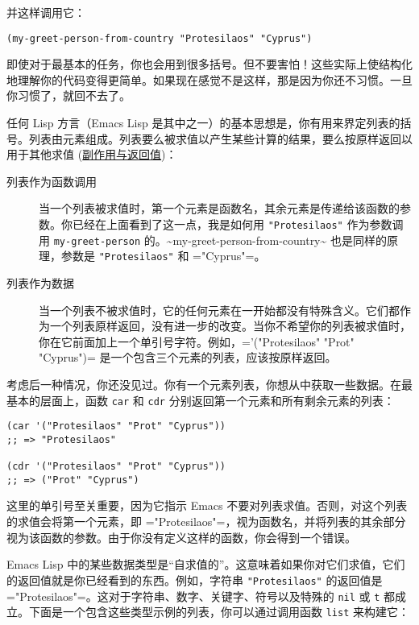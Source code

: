 \documentclass[11pt]{ctexart}
\begin{document}
并这样调用它：

\begin{verbatim}
(my-greet-person-from-country "Protesilaos" "Cyprus")
\end{verbatim}

即使对于最基本的任务，你也会用到很多括号。但不要害怕！这些实际上使结构化地理解你的代码变得更简单。如果现在感觉不是这样，那是因为你还不习惯。一旦你习惯了，就回不去了。

任何 Lisp 方言（Emacs Lisp 是其中之一）的基本思想是，你有用来界定列表的括号。列表由元素组成。列表要么被求值以产生某些计算的结果，要么按原样返回以用于其他求值 (\hyperref[sec:org7601617]{副作用与返回值})：

\begin{description}
\item[{列表作为函数调用}] 当一个列表被求值时，第一个元素是函数名，其余元素是传递给该函数的参数。你已经在上面看到了这一点，我是如何用 \texttt{"Protesilaos"} 作为参数调用 \texttt{my-greet-person} 的。\textasciitilde{}my-greet-person-from-country\textasciitilde{} 也是同样的原理，参数是 \texttt{"Protesilaos"} 和 ="Cyprus"=。

\item[{列表作为数据}] 当一个列表不被求值时，它的任何元素在一开始都没有特殊含义。它们都作为一个列表原样返回，没有进一步的改变。当你不希望你的列表被求值时，你在它前面加上一个单引号字符。例如，='("Protesilaos" "Prot" "Cyprus")= 是一个包含三个元素的列表，应该按原样返回。
\end{description}

考虑后一种情况，你还没见过。你有一个元素列表，你想从中获取一些数据。在最基本的层面上，函数 \texttt{car} 和 \texttt{cdr} 分别返回第一个元素和所有剩余元素的列表：

\begin{verbatim}
(car '("Protesilaos" "Prot" "Cyprus"))
;; => "Protesilaos"

(cdr '("Protesilaos" "Prot" "Cyprus"))
;; => ("Prot" "Cyprus")
\end{verbatim}

这里的单引号至关重要，因为它指示 Emacs 不要对列表求值。否则，对这个列表的求值会将第一个元素，即 ="Protesilaos"=，视为函数名，并将列表的其余部分视为该函数的参数。由于你没有定义这样的函数，你会得到一个错误。

Emacs Lisp 中的某些数据类型是“自求值的”。这意味着如果你对它们求值，它们的返回值就是你已经看到的东西。例如，字符串 \texttt{"Protesilaos"} 的返回值是 ="Protesilaos"=。这对于字符串、数字、关键字、符号以及特殊的 \texttt{nil} 或 \texttt{t} 都成立。下面是一个包含这些类型示例的列表，你可以通过调用函数 \texttt{list} 来构建它：
\end{document}
